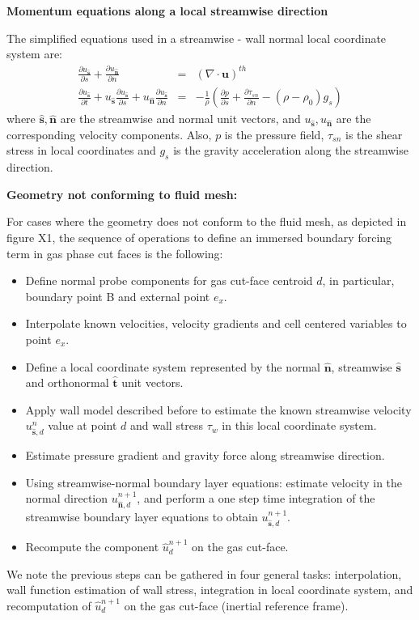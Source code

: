 \documentclass[12pt]{article}
\begin{document}



\bigskip
\noindent
\textbf{Momentum equations along a local streamwise direction}
\bigskip

The simplified equations used in a streamwise - wall normal local coordinate system are:
%
\begin{eqnarray}
   \frac{\partial u_{\hat{\mathbf{s}}}}{\partial s} +  \frac{\partial u_{\hat{\mathbf{n}}}}{\partial n} &=& \left( \nabla \cdot \mathbf{u} \right)^{th}  \label{eq:blcont} \\
    \frac{\partial u_{\hat{\mathbf{s}}}}{\partial t} + u_{\hat{\mathbf{s}}} \frac{\partial u_{\hat{\mathbf{s}}}}{\partial s} +
    u_{\hat{\mathbf{n}}} \frac{\partial u_{\hat{\mathbf{s}}}}{\partial n} &=& - \frac{1}{\rho} \left( \frac{\partial p}{\partial s} +
    \frac{\partial \tau_{sn}}{\partial n} - (\rho -\rho_0) g_s \right) \label{eq:blmom}
\end{eqnarray}
%
where $\hat{\mathbf{s}},\hat{\mathbf{n}}$ are the streamwise and normal unit vectors, and $u_{\hat{\mathbf{s}}},u_{\hat{\mathbf{n}}}$ are the corresponding velocity components. Also, $p$ is the pressure field, $\tau_{sn}$ is the shear stress in local coordinates and $g_s$ is the gravity acceleration along the streamwise direction.

\bigskip
\noindent
\textbf{Geometry not conforming to fluid mesh:}
\bigskip

For cases where the geometry does not conform to the fluid mesh, as depicted in figure X1, the sequence of operations to define an immersed boundary forcing term in gas phase cut faces is the following:
%
\begin{itemize}
   \item Define normal probe components for gas cut-face centroid $d$, in particular, boundary point B and external point $e_x$.
   \item Interpolate known velocities, velocity gradients and cell centered variables to point $e_x$.
   \item Define a local coordinate system represented by the normal $\hat{\mathbf{n}}$, streamwise $\hat{\mathbf{s}}$ and orthonormal $\hat{\mathbf{t}}$ unit vectors.
   \item Apply wall model described before to estimate the known streamwise velocity $u_{\hat{\mathbf{s}},d}^n$ value at point $d$ and wall stress $\tau_w$ in this local coordinate system.
   \item Estimate pressure gradient and gravity force along streamwise direction.
   \item Using streamwise-normal boundary layer equations: estimate velocity in the normal direction $u_{\hat{\mathbf{n}},d}^{n+1}$, and perform a one step time integration of the streamwise boundary layer equations to obtain $u_{\hat{\mathbf{s}},d}^{n+1}$.
   \item Recompute the component $\hat{u}_d^{n+1}$ on the gas cut-face.
\end{itemize}
%
We note the previous steps can be gathered in four general tasks: interpolation, wall function estimation of wall stress, integration in local coordinate system, and recomputation of $\hat{u}_d^{n+1}$ on the gas cut-face (inertial reference frame).
\end{document}

